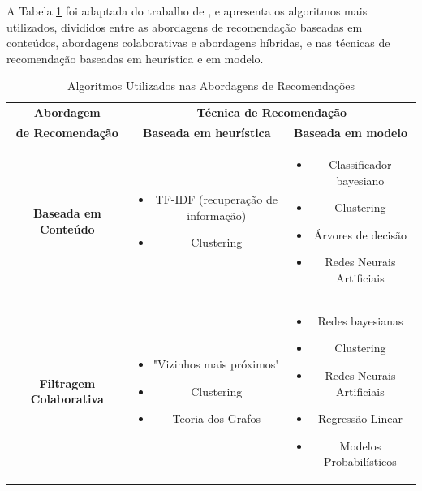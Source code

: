 A Tabela \ref{tab01} foi adaptada do trabalho de , e apresenta os algoritmos mais utilizados, 
divididos entre as abordagens de recomendação baseadas em conteúdos, abordagens colaborativas e 
abordagens híbridas, e nas técnicas de recomendação baseadas em heurística e em modelo. 

\begin{table}[]
	\centering
	\caption{Algoritmos Utilizados nas Abordagens de Recomendações}
	\label{tab01}
	\begin{tabular}{|c|c|c|}
	\hline
	\rowcolor[HTML]{C0C0C0} 
	\cellcolor[HTML]{C0C0C0} \textbf{Abordagem} & \multicolumn{2}{c|}{\cellcolor[HTML]{C0C0C0} \textbf{Técnica de Recomendação}} \\ \cline{2-3} 
	\rowcolor[HTML]{C0C0C0} \textbf{de Recomendação}
	\multirow{-2}{*}{\cellcolor[HTML]{C0C0C0}} &  \textbf{Baseada em heurística} & \textbf{Baseada em modelo} \\ \hline
	\textbf{Baseada em Conteúdo	}   & \begin{minipage} [t] {0.3\textwidth} \begin{itemize} \item TF-IDF (recuperação de informação) \item Clustering \end{itemize} \end{minipage} & \begin{minipage} [t] {0.3\textwidth} \begin{itemize} \item Classificador bayesiano \item Clustering \item Árvores de decisão \item Redes Neurais Artificiais \end{itemize} \end{minipage} \\ \hline
	\rowcolor[HTML]{EFEFEF} 
	\textbf{Filtragem Colaborativa}	& \begin{minipage} [t] {0.3\textwidth} \begin{itemize} \item "Vizinhos mais próximos" \item Clustering \item Teoria dos Grafos \end{itemize} \end{minipage} & \begin{minipage} [t] {0.3\textwidth} \begin{itemize} \item  Redes bayesianas \item Clustering \item Redes Neurais Artificiais \item Regressão Linear \item Modelos Probabilísticos \end{itemize} \end{minipage} \\ \hline

\end{tabular}
\end{table}
